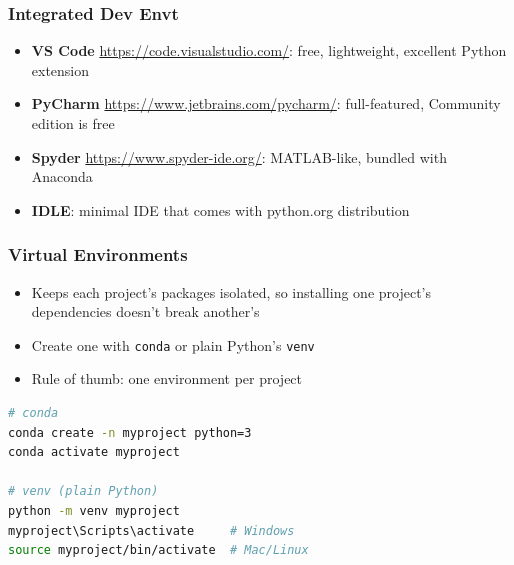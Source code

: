\begin{frame}[fragile]\frametitle{Integrated Dev Envt}
  \begin{itemize}
  \item \textbf{VS Code} \url{https://code.visualstudio.com/}: free, lightweight, excellent Python extension
  \item \textbf{PyCharm} \url{https://www.jetbrains.com/pycharm/}: full-featured, Community edition is free
  \item \textbf{Spyder} \url{https://www.spyder-ide.org/}: MATLAB-like, bundled with Anaconda
  \item \textbf{IDLE}: minimal IDE that comes with python.org distribution
  \end{itemize}
\end{frame}

\begin{frame}[fragile]\frametitle{Virtual Environments}
  \begin{itemize}
  \item Keeps each project's packages isolated, so installing one project's dependencies doesn't break another's
  \item Create one with \texttt{conda} or plain Python's \texttt{venv}
  \item Rule of thumb: one environment per project
  \end{itemize}
  \begin{lstlisting}[language=bash]
# conda
conda create -n myproject python=3
conda activate myproject

# venv (plain Python)
python -m venv myproject
myproject\Scripts\activate     # Windows
source myproject/bin/activate  # Mac/Linux
  \end{lstlisting}
\end{frame}


